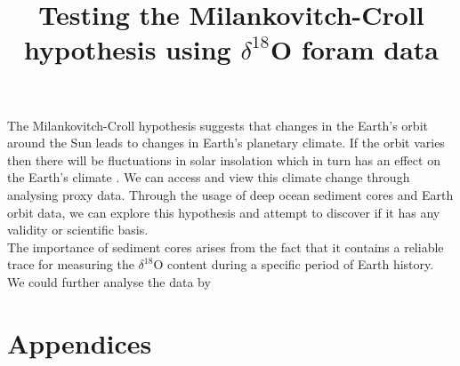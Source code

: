 \documentclass[12pt, onecolumn]{revtex4}    %
\begin{document}
                     

\title{Testing the Milankovitch-Croll hypothesis using $\delta^{18}$O foram data} 
\maketitle

\vspace{-4ex}

The Milankovitch-Croll hypothesis suggests that changes in the Earth's orbit around the Sun leads to changes in Earth's planetary climate. If the orbit varies then there will be fluctuations in solar insolation which in turn has an effect on the Earth's climate \cite{ruddiman_climate}. We can access and view this climate change through analysing proxy data. Through the usage of deep ocean sediment cores and Earth orbit data, we can explore this hypothesis and attempt to discover if it has any validity or scientific basis. \\

The importance of sediment cores arises from the fact that it contains a reliable trace for measuring the $\delta^{18}$O content during a specific period of Earth history. \\

We could further analyse the data by

\newpage





\newpage

\section*{Appendices}
\end{document}
